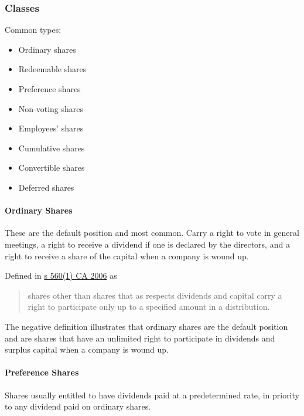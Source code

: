 \documentclass[
]{article}
\providecommand{\tightlist}{%
  \setlength{\itemsep}{0pt}\setlength{\parskip}{0pt}}
\begin{document}
\hypertarget{classes}{%
\subsubsection{Classes}\label{classes}}

Common types:

\begin{itemize}
\tightlist
\item
  Ordinary shares
\item
  Redeemable shares
\item
  Preference shares
\item
  Non-voting shares
\item
  Employees' shares
\item
  Cumulative shares
\item
  Convertible shares
\item
  Deferred shares
\end{itemize}

\hypertarget{ordinary-shares}{%
\paragraph{Ordinary Shares}\label{ordinary-shares}}

These are the default position and most common. Carry a right to vote in
general meetings, a right to receive a dividend if one is declared by
the directors, and a right to receive a share of the capital when a
company is wound up.

Defined in
\href{https://www.legislation.gov.uk/ukpga/2006/46/section/560}{s 560(1)
CA 2006} as

\begin{quote}
shares other than shares that as respects dividends and capital carry a
right to participate only up to a specified amount in a distribution.
\end{quote}

The negative definition illustrates that ordinary shares are the default
position and are shares that have an unlimited right to participate in
dividends and surplus capital when a company is wound up.

\hypertarget{preference-shares}{%
\paragraph{Preference Shares}\label{preference-shares}}

Shares usually entitled to have dividends paid at a predetermined rate,
in priority to any dividend paid on ordinary shares.
\end{document}
